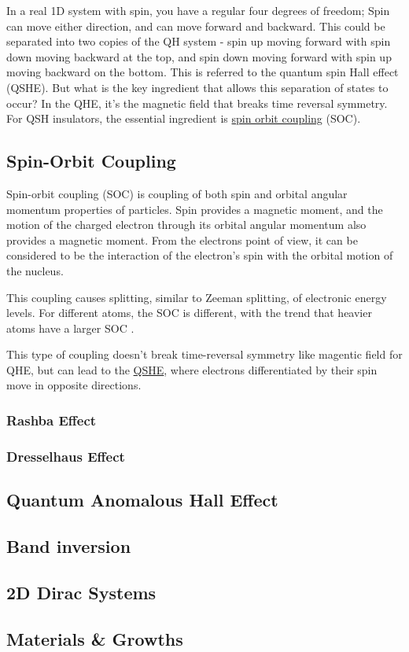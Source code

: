 In a real 1D system with spin, you have a regular four degrees of freedom; Spin can move either direction, and can move forward and backward. This could be separated into two copies of the QH system - spin up moving forward with spin down moving backward at the top, and spin down moving forward with spin up moving backward on the bottom. This is referred to the quantum spin Hall effect (QSHE).
But what is the key ingredient that allows this separation of states to occur? In the QHE, it's the magnetic field that breaks time reversal symmetry. For QSH insulators, the essential ingredient is \hyperref[sec:SOC]{spin orbit coupling} (SOC).

\subsection{Spin-Orbit Coupling}\label{sec:SOC}
Spin-orbit coupling (SOC) is coupling of both spin and orbital angular momentum properties of particles. Spin provides a magnetic moment, and the motion of the charged electron through its orbital angular momentum also provides a magnetic moment. From the electrons point of view, it can be considered to be the interaction of the electron's spin with the orbital motion of the nucleus.

This coupling causes splitting, similar to Zeeman splitting, of electronic energy levels. For different atoms, the SOC is different, with the trend that heavier atoms have a larger SOC \cite{herman_relativistic_1963}. 

This type of coupling doesn't break time-reversal symmetry like magentic field for QHE, but can lead to the \hyperref[sec:QSHE]{QSHE}, where electrons differentiated by their spin move in opposite directions.

\subsubsection{Rashba Effect}

\subsubsection{Dresselhaus Effect}





\subsection{Quantum Anomalous Hall Effect}\label{sec:QAHE}



\subsection{Band inversion}

\subsection{2D Dirac Systems}

\subsection{Materials \& Growths}
\subsubsection{\bismuthselinide{}}
